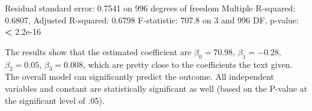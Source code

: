 \documentclass[
]{article}
\newenvironment{Shaded}{\begin{snugshade}}{\end{snugshade}}
\newcommand{\DecValTok}[1]{\textcolor[rgb]{0.00,0.00,0.81}{#1}}
\newcommand{\ErrorTok}[1]{\textcolor[rgb]{0.64,0.00,0.00}{\textbf{#1}}}
\newcommand{\FloatTok}[1]{\textcolor[rgb]{0.00,0.00,0.81}{#1}}
\newcommand{\NormalTok}[1]{#1}
\newcommand{\SpecialCharTok}[1]{\textcolor[rgb]{0.00,0.00,0.00}{#1}}
\begin{document}
\begin{Shaded}
\begin{Highlighting}[]
\NormalTok{Residual standard error}\SpecialCharTok{:} \FloatTok{0.7541}\NormalTok{ on }\DecValTok{996}\NormalTok{ degrees of freedom}
\NormalTok{Multiple R}\SpecialCharTok{{-}}\NormalTok{squared}\SpecialCharTok{:}  \FloatTok{0.6807}\NormalTok{,    Adjusted R}\SpecialCharTok{{-}}\NormalTok{squared}\SpecialCharTok{:}  \FloatTok{0.6798} 
\NormalTok{F}\SpecialCharTok{{-}}\NormalTok{statistic}\SpecialCharTok{:} \FloatTok{707.8}\NormalTok{ on }\DecValTok{3}\NormalTok{ and }\DecValTok{996}\NormalTok{ DF,  p}\SpecialCharTok{{-}}\NormalTok{value}\SpecialCharTok{:} \ErrorTok{\textless{}} \FloatTok{2.2e{-}16}
\end{Highlighting}
\end{Shaded}

The results show that the estimated coefficient are \(\beta_0 = 70.98\),
\(\beta_1 = -0.28\),\(\beta_2 = 0.05\), \(\beta_3 = 0.008\), which are
pretty close to the coefficients the text given. The overall model can
significantly predict the outcome. All independent variables and
constant are statistically significant as well (based on the P-value at
the significant level of .05).
\end{document}
